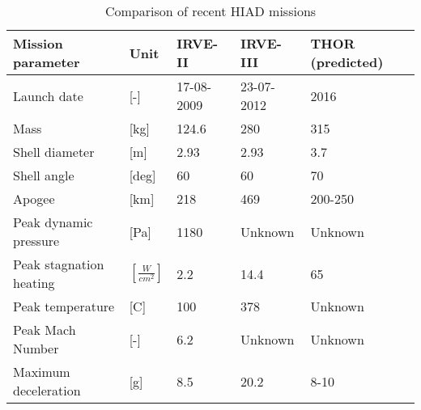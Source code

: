 \begin{table}[h!]
	\caption{Comparison of recent HIAD missions}%
		\begin{tabular}{|p{}|p{}|p{}|p{}|p{}|} %
			\hline

       Mission parameter   &       Unit &     IRVE-II \cite{Dillman2010} &     IRVE-III \citep{Dillman2012,Dillman2014} & THOR (predicted) \citep{Dillman2014} \\
			\hline \hline

Launch date &          [-] & 17-08-2009 & 23-07-2012 &       2016 \\
			\hline

      Mass &         [kg] &    124.6 &        280 &        315 \\
			\hline

Shell diameter &          [m] &       2.93 &       2.93 &        3.7 \\
			\hline

Shell angle &     [deg] &         60 &         60 &         70 \\
			\hline

    Apogee &         [km] &        218 &        469 &    200-250 \\
			\hline

Peak dynamic pressure &         [Pa] &       1180 &   Unknown         &   Unknown         \\
			\hline

Peak stagnation heating &     $ [\frac{W}{cm^{2}}]$ &        2.2 &       14.4 &         65 \\
			\hline

Peak temperature &          [C] &        100 &        378 &      Unknown      \\
			\hline

Peak Mach Number &          [-] &        6.2 &  Unknown          &   Unknown         \\
			\hline

Maximum deceleration &          [g] &        8.5 &       20.2 &       8-10 \\
			\hline

		\end{tabular}
    \label{tab:hiadcomparison}%
\end{table}

